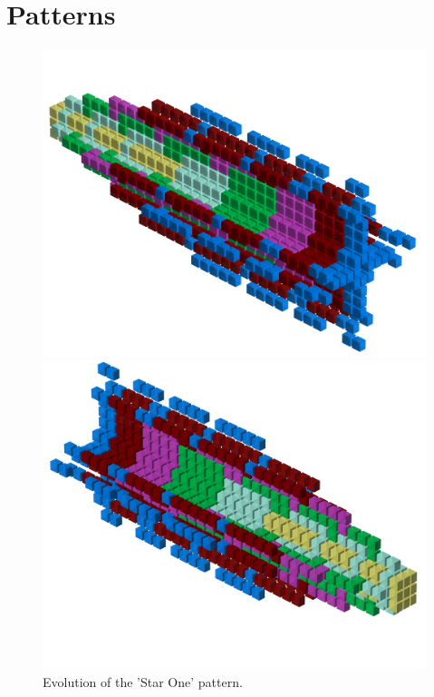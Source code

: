 \chapter{Patterns} 
\lstset{style=6502Style}


\clearpage
\begin{figure}[H]
    \centering
    \begin{adjustbox}{width=12cm,center}
      \includegraphics[width=12cm]{src/patterns/pattern0-45.png}%
    \end{adjustbox}
    \begin{adjustbox}{width=12cm,margin=0cm -2cm}
      \includegraphics[width=12cm]{src/patterns/pattern0-225.png}%
    \end{adjustbox}
\caption{Evolution of the 'Star One' pattern.}
\end{figure}

